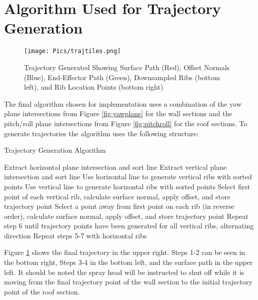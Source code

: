 \section{Algorithm Used for Trajectory Generation}

\begin{figure}[H]
    \centering
    \texttt{[image: Pics/trajtiles.png]}
    \caption{Trajectory Generated Showing Surface Path (Red), Offset Normals (Blue), End-Effector Path (Green), Downsampled Ribs (bottom left), and Rib Location Points (bottom right)}
    \label{fig:trajtiles}
\end{figure}

The final algorithm chosen for implementation uses a combination of the yaw plane intersections from Figure \ref{fig:yawplane} for the wall sections and the pitch/roll plane intersections from Figure \ref{fig:pitchroll} for the roof sections. To generate trajectories the algorithm uses the following structure:

\begin{algorithm}[H]
\caption{Trajectory Generation Algorithm}
\label{alg:trajgen}
\begin{algorithmic}[1]

    \State Extract horizontal plane intersection and sort line
    \State Extract vertical plane intersection and sort line
    \State Use horizontal line to generate vertical ribs with sorted points
    \State Use vertical line to generate horizontal ribs with sorted points
    \State Select first point of each vertical rib, calculate surface normal, apply offset, and store trajectory point
    \State Select a point  away from first point on each rib (in reverse order), calculate surface normal, apply offset, and store trajectory point
    \State Repeat step 6 until trajectory points have been generated for all vertical ribs, alternating direction
    \State Repeat steps 5-7 with horizontal ribs

\end{algorithmic}
\end{algorithm}

Figure \ref{fig:trajtiles} shows the final trajectory in the upper right. Steps 1-2 can be seen in the bottom right, Steps 3-4 in the bottom left, and the surface path in the upper left. It should be noted the spray head will be instructed to shut off while it is moving from the final trajectory point of the wall section to the initial trajectory point of the roof section.\\

